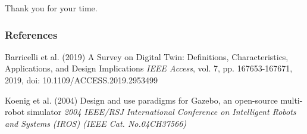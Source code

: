 \documentclass{beamer}
\begin{document}
\begin{frame}
\Huge{\centerline{Thank you for your time.}}
\end{frame}

\begin{frame}
    \frametitle{References}
    \footnotesize{
    \begin{thebibliography}{99} %
    Barricelli et al. (2019)
   \newblock A Survey on Digital Twin: Definitions, Characteristics, Applications, and Design Implications
   \newblock \emph{IEEE Access}, vol. 7, pp. 167653-167671, 2019, doi: 10.1109/ACCESS.2019.2953499

     Koenig et al. (2004)
    \newblock Design and use paradigms for Gazebo, an open-source multi-robot simulator
    \newblock \emph{2004 IEEE/RSJ International Conference on Intelligent Robots and Systems (IROS) (IEEE Cat. No.04CH37566)}

    \end{thebibliography}
    }
\end{frame}

\end{document}
